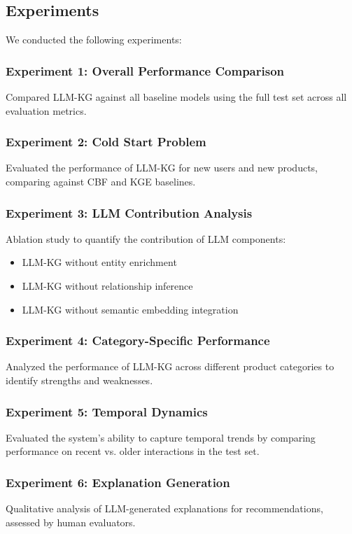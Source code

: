\documentclass{article}
\begin{document}
\subsection{Experiments}

We conducted the following experiments:

\subsubsection{Experiment 1: Overall Performance Comparison}
Compared LLM-KG against all baseline models using the full test set across all evaluation metrics.

\subsubsection{Experiment 2: Cold Start Problem}
Evaluated the performance of LLM-KG for new users and new products, comparing against CBF and KGE baselines.

\subsubsection{Experiment 3: LLM Contribution Analysis}
Ablation study to quantify the contribution of LLM components:
\begin{itemize}
    \item LLM-KG without entity enrichment
    \item LLM-KG without relationship inference
    \item LLM-KG without semantic embedding integration
\end{itemize}

\subsubsection{Experiment 4: Category-Specific Performance}
Analyzed the performance of LLM-KG across different product categories to identify strengths and weaknesses.

\subsubsection{Experiment 5: Temporal Dynamics}
Evaluated the system's ability to capture temporal trends by comparing performance on recent vs. older interactions in the test set.

\subsubsection{Experiment 6: Explanation Generation}
Qualitative analysis of LLM-generated explanations for recommendations, assessed by human evaluators.
\end{document}
